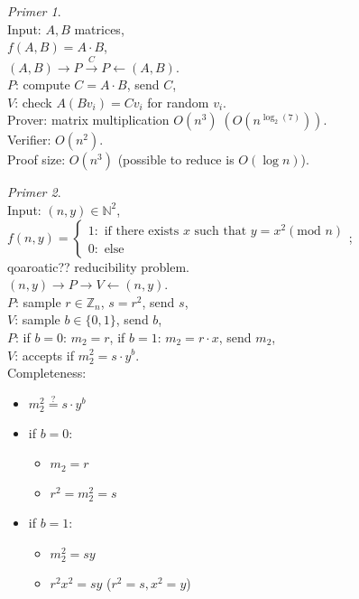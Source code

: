 \documentclass[a4paper, 12pt]{book}
\theoremstyle{definition}
\theoremstyle{remark}
\newtheorem*{ex}{Primer}
\newcommand{\N}{\mathbb{N}}
\newcommand{\Z}{\mathbb{Z}}
\begin{document}
\begin{ex} \text{} \\
  Input: $A, B$ matrices, \\
  $f(A, B) = A \cdot B$, \\
  $(A, B) \to P \stackrel{C}{\to} P \leftarrow (A, B)$. \\
  $P$: compute $C = A \cdot B$, send $C$, \\
  $V$: check $A (B v_i) = C v_i$ for random $v_i$. \\
  Prover: matrix multiplication $O(n^3) \; (O(n^{\log_2(7)}))$. \\
  Verifier: $O(n^2)$. \\
  Proof size: $O(n^3)$ (possible to reduce is $O(\log n)$).
\end{ex}
\begin{ex} \text{} \\
  Input: $(n, y) \in \N^2$, \\
  $f(n, y) = \begin{cases}
    1: \text{ if there exists $x$ such that } y = x^2 (\text{mod } n) \\
    0: \text{ else}
  \end{cases}$; \\
  qoaroatic?? reducibility problem. \\
  $(n, y) \to P \to V \leftarrow (n, y)$. \\
  $P$: sample $r \in \Z_n$, $s = r^2$, send $s$, \\
  $V$: sample $b \in \{0, 1\}$, send $b$, \\
  $P$: if $b = 0$: $m_2 = r$, if $b = 1$: $m_2 = r \cdot x$, send $m_2$, \\
  $V$: accepts if $m_2^2 = s \cdot y^b$. \\
  Completeness:
  \begin{itemize}[label={}]
    \item $m_2^2 \stackrel{?}{=} s \cdot y^b$
    \item if $b = 0:$
    \begin{itemize}[label={}]
      \item $m_2 = r$
      \item $r^2 = m_2^2 = s$ \checkmark
    \end{itemize}
    \item if $b = 1:$
    \begin{itemize}[label={}]
      \item $m_2^2 = s y$ 
      \item $r^2 x^2 = s y$ \checkmark ($r^2 = s, x^2 = y$)

\end{itemize}
\end{itemize}
\end{ex}
\end{document}
